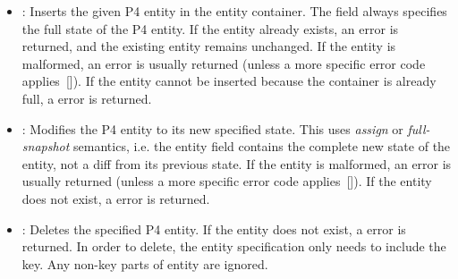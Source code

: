 \documentclass[11pt]{article}
\begin{document}
{\begin{itemize}
\item{}
: Inserts the given P4 entity in the entity container.
The  field always specifies the full state of the P4 entity.
If the entity already exists, an  error is returned, and
the existing entity remains unchanged. If the entity is malformed, an
 error is usually returned (unless a more specific error
code applies~[]). If the entity cannot be inserted because the
container is already full, a  error is returned.%

\item{}
: Modifies the P4 entity to its new specified state. This uses
\emph{assign} or \emph{full-snapshot} semantics, i.e. the entity field contains the
complete new state of the entity, not a diff from its previous state. If the
entity is malformed, an  error is usually returned (unless a
more specific error code applies~[]). If the entity does not
exist, a  error is returned.%

\item{}
: Deletes the specified P4 entity. If the entity does not exist, a
 error is returned. In order to delete, the entity specification
only needs to include the key. Any non-key parts of entity are ignored.%
\end{itemize}%

}
\end{document}
